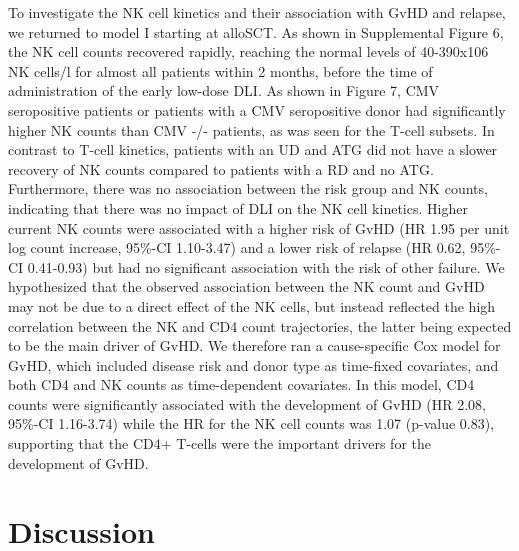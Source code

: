 \documentclass[
  letterpaper,
  DIV=11,
  numbers=noendperiod]{scrreprt}
\begin{document}
To investigate the NK cell kinetics and their association with GvHD and
relapse, we returned to model I starting at alloSCT. As shown in
Supplemental Figure 6, the NK cell counts recovered rapidly, reaching
the normal levels of 40-390x106 NK cells/l for almost all patients
within 2 months, before the time of administration of the early low-dose
DLI. As shown in Figure 7, CMV seropositive patients or patients with a
CMV seropositive donor had significantly higher NK counts than CMV -/-
patients, as was seen for the T-cell subsets. In contrast to T-cell
kinetics, patients with an UD and ATG did not have a slower recovery of
NK counts compared to patients with a RD and no ATG. Furthermore, there
was no association between the risk group and NK counts, indicating that
there was no impact of DLI on the NK cell kinetics. Higher current NK
counts were associated with a higher risk of GvHD (HR 1.95 per unit log
count increase, 95\%-CI 1.10-3.47) and a lower risk of relapse (HR 0.62,
95\%-CI 0.41-0.93) but had no significant association with the risk of
other failure. We hypothesized that the observed association between the
NK count and GvHD may not be due to a direct effect of the NK cells, but
instead reflected the high correlation between the NK and CD4 count
trajectories, the latter being expected to be the main driver of GvHD.
We therefore ran a cause-specific Cox model for GvHD, which included
disease risk and donor type as time-fixed covariates, and both CD4 and
NK counts as time-dependent covariates. In this model, CD4 counts were
significantly associated with the development of GvHD (HR 2.08, 95\%-CI
1.16-3.74) while the HR for the NK cell counts was 1.07 (p-value 0.83),
supporting that the CD4+ T-cells were the important drivers for the
development of GvHD.

\hypertarget{discussion-1}{%
\section{Discussion}\label{discussion-1}}
\end{document}
